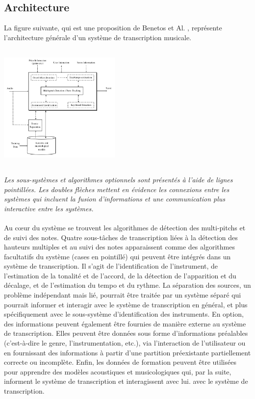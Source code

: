 \subsection*{Architecture}
La figure suivante, qui est une proposition de Benetos et Al. \cite{article1}, représente l'architecture générale d'un système de transcription musicale.\\\\
\includegraphics[height=60mm, width=60mm]{z_images/1_automatic_transcription/0_general_process.png}\\\\
\textit{Les sous-systèmes et algorithmes optionnels sont présentés à l'aide de lignes pointillées. Les doubles flèches mettent en évidence les connexions entre les systèmes qui incluent la fusion d'informations et une communication plus interactive entre les systèmes.}\\\\
Au cœur du système se trouvent les algorithmes de détection des multi-pitchs et de suivi des notes. Quatre sous-tâches de transcription liées à la détection des hauteurs multiples et au suivi des notes apparaissent comme des algorithmes facultatifs du système (cases en pointillé) qui peuvent être intégrés dans un système de transcription. Il s'agit de l'identification de l'instrument, de l'estimation de la tonalité et de l'accord, de la détection de l'apparition et du décalage, et de l'estimation du tempo et du rythme. La séparation des sources, un problème indépendant mais lié, pourrait être traitée par un système séparé qui pourrait informer et interagir avec le système de transcription en général, et plus spécifiquement avec le sous-système d'identification des instruments.
En option, des informations peuvent également être fournies de manière externe au système de transcription. Elles peuvent être données sous forme d'informations préalables (c'est-à-dire le genre, l'instrumentation, etc.), via l'interaction de l'utilisateur ou en fournissant des informations à partir d'une partition préexistante partiellement correcte ou incomplète. Enfin, les données de formation peuvent être utilisées pour apprendre des modèles acoustiques et musicologiques qui, par la suite, informent le système de transcription et interagissent avec lui. avec le système de transcription.\\
